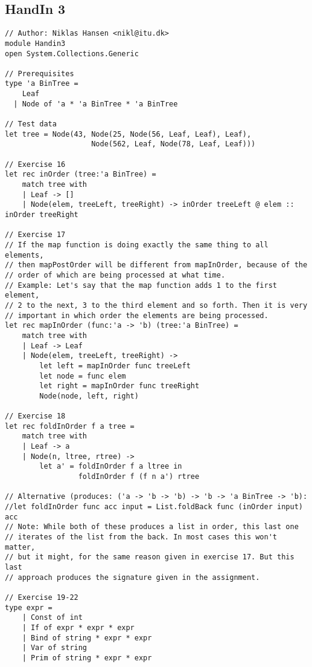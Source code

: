 \subsection{HandIn 3}
\label{Appendix_FSharp_Niklas_3}
\begin{lstlisting}
// Author: Niklas Hansen <nikl@itu.dk>
module Handin3
open System.Collections.Generic

// Prerequisites
type 'a BinTree = 
    Leaf
  | Node of 'a * 'a BinTree * 'a BinTree

// Test data
let tree = Node(43, Node(25, Node(56, Leaf, Leaf), Leaf), 
					Node(562, Leaf, Node(78, Leaf, Leaf)))

// Exercise 16
let rec inOrder (tree:'a BinTree) =
    match tree with
    | Leaf -> []
    | Node(elem, treeLeft, treeRight) -> inOrder treeLeft @ elem :: inOrder treeRight

// Exercise 17
// If the map function is doing exactly the same thing to all elements,
// then mapPostOrder will be different from mapInOrder, because of the 
// order of which are being processed at what time.
// Example: Let's say that the map function adds 1 to the first element,
// 2 to the next, 3 to the third element and so forth. Then it is very 
// important in which order the elements are being processed.
let rec mapInOrder (func:'a -> 'b) (tree:'a BinTree) =
    match tree with
    | Leaf -> Leaf
    | Node(elem, treeLeft, treeRight) ->
        let left = mapInOrder func treeLeft
        let node = func elem
        let right = mapInOrder func treeRight
        Node(node, left, right)

// Exercise 18
let rec foldInOrder f a tree =
    match tree with
    | Leaf -> a
    | Node(n, ltree, rtree) -> 
        let a' = foldInOrder f a ltree in
                 foldInOrder f (f n a') rtree

// Alternative (produces: ('a -> 'b -> 'b) -> 'b -> 'a BinTree -> 'b):
//let foldInOrder func acc input = List.foldBack func (inOrder input) acc
// Note: While both of these produces a list in order, this last one 
// iterates of the list from the back. In most cases this won't matter, 
// but it might, for the same reason given in exercise 17. But this last 
// approach produces the signature given in the assignment.

// Exercise 19-22
type expr =
    | Const of int
    | If of expr * expr * expr
    | Bind of string * expr * expr
    | Var of string
    | Prim of string * expr * expr


\end{lstlisting}
